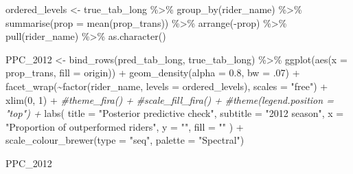 \documentclass[
]{article}
\newenvironment{Shaded}{\begin{snugshade}}{\end{snugshade}}
\newcommand{\AttributeTok}[1]{\textcolor[rgb]{0.77,0.63,0.00}{#1}}
\newcommand{\CommentTok}[1]{\textcolor[rgb]{0.56,0.35,0.01}{\textit{#1}}}
\newcommand{\DecValTok}[1]{\textcolor[rgb]{0.00,0.00,0.81}{#1}}
\newcommand{\FloatTok}[1]{\textcolor[rgb]{0.00,0.00,0.81}{#1}}
\newcommand{\FunctionTok}[1]{\textcolor[rgb]{0.00,0.00,0.00}{#1}}
\newcommand{\NormalTok}[1]{#1}
\newcommand{\OtherTok}[1]{\textcolor[rgb]{0.56,0.35,0.01}{#1}}
\newcommand{\SpecialCharTok}[1]{\textcolor[rgb]{0.00,0.00,0.00}{#1}}
\newcommand{\StringTok}[1]{\textcolor[rgb]{0.31,0.60,0.02}{#1}}
\begin{document}
\begin{Shaded}
\begin{Highlighting}[]
\NormalTok{ordered\_levels }\OtherTok{\textless{}{-}}
\NormalTok{  true\_tab\_long }\SpecialCharTok{\%\textgreater{}\%}
  \FunctionTok{group\_by}\NormalTok{(rider\_name) }\SpecialCharTok{\%\textgreater{}\%}
  \FunctionTok{summarise}\NormalTok{(}\AttributeTok{prop =} \FunctionTok{mean}\NormalTok{(prop\_trans)) }\SpecialCharTok{\%\textgreater{}\%}
  \FunctionTok{arrange}\NormalTok{(}\SpecialCharTok{{-}}\NormalTok{prop) }\SpecialCharTok{\%\textgreater{}\%}
  \FunctionTok{pull}\NormalTok{(rider\_name) }\SpecialCharTok{\%\textgreater{}\%}
  \FunctionTok{as.character}\NormalTok{()}


\NormalTok{PPC\_2012 }\OtherTok{\textless{}{-}} \FunctionTok{bind\_rows}\NormalTok{(pred\_tab\_long, true\_tab\_long) }\SpecialCharTok{\%\textgreater{}\%}
            \FunctionTok{ggplot}\NormalTok{(}\FunctionTok{aes}\NormalTok{(}\AttributeTok{x =}\NormalTok{ prop\_trans, }\AttributeTok{fill =}\NormalTok{ origin)) }\SpecialCharTok{+}
            \FunctionTok{geom\_density}\NormalTok{(}\AttributeTok{alpha =} \FloatTok{0.8}\NormalTok{, }\AttributeTok{bw =}\NormalTok{ .}\DecValTok{07}\NormalTok{) }\SpecialCharTok{+}
            \FunctionTok{facet\_wrap}\NormalTok{(}\SpecialCharTok{\textasciitilde{}}\FunctionTok{factor}\NormalTok{(rider\_name, }\AttributeTok{levels =}\NormalTok{ ordered\_levels), }\AttributeTok{scales =} \StringTok{"free"}\NormalTok{) }\SpecialCharTok{+}
            \FunctionTok{xlim}\NormalTok{(}\DecValTok{0}\NormalTok{, }\DecValTok{1}\NormalTok{) }\SpecialCharTok{+}
            \CommentTok{\#theme\_fira() +}
            \CommentTok{\#scale\_fill\_fira() +}
            \CommentTok{\#theme(legend.position = "top") +}
            \FunctionTok{labs}\NormalTok{(}
              \AttributeTok{title =} \StringTok{"Posterior predictive check"}\NormalTok{,}
              \AttributeTok{subtitle =} \StringTok{"2012 season"}\NormalTok{,}
              \AttributeTok{x =} \StringTok{"Proportion of outperformed riders"}\NormalTok{,}
              \AttributeTok{y =} \StringTok{""}\NormalTok{,}
              \AttributeTok{fill =} \StringTok{""}
\NormalTok{            ) }\SpecialCharTok{+}
            \FunctionTok{scale\_colour\_brewer}\NormalTok{(}\AttributeTok{type =} \StringTok{"seq"}\NormalTok{, }\AttributeTok{palette =} \StringTok{"Spectral"}\NormalTok{)}

\NormalTok{PPC\_2012}
\end{Highlighting}
\end{Shaded}
\end{document}
